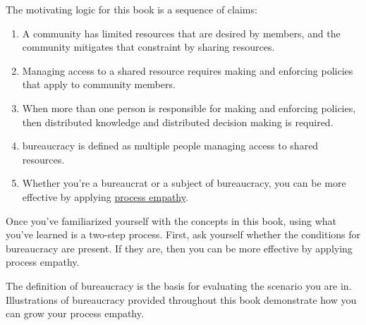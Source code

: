 The motivating logic for this book is a sequence of claims:
\begin{enumerate}
    \item A community has limited resources that are desired by members, and the community mitigates that constraint by sharing resources.
    \item Managing access to a \gls{shared resource} requires making and enforcing policies that apply to community members. 
    \item When more than one person is responsible for making and enforcing policies, then distributed knowledge and distributed decision making is required. 
    \item \Gls{bureaucracy} is defined as multiple people managing access to \glspl{shared resource}. 
    \item Whether you're a \gls{bureaucrat} or a subject of bureaucracy, you can be more effective by applying \hyperref[sec:process-empathy]{process empathy}.
\end{enumerate}

Once you've familiarized yourself with the concepts in this book, using what you've learned is a two-step process. First, ask yourself whether the conditions for bureaucracy are present. If they are, then you can be more effective by applying process empathy.

The definition of bureaucracy is the basis for evaluating the scenario you are in. Illustrations of bureaucracy provided throughout this book demonstrate how you can grow your process empathy. 